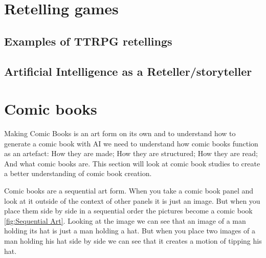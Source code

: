 \section{Retelling games}

\subsection{Examples of TTRPG retellings}

\subsection{Artificial Intelligence as a Reteller/storyteller}

\section{Comic books}
Making Comic Books is an art form on its own and to understand how to generate a comic book with AI we need to understand how comic books function as an artefact: How they are made; How they are structured; How they are read; And what comic books are. This section will look at comic book studies to create a better understanding of comic book creation.

Comic books are a sequential art form\cite{eisner2008comics}. When you take a comic book panel and look at it outside of the context of other panels it is just an image. But when you place them side by side in a sequential order the pictures become a comic book \ref{fig:Sequential Art}. Looking at the image we can see that an image of a man holding its hat is just a man holding a hat. But when you place two images of a man holding his hat side by side we can see that it creates a motion of tipping his hat.

